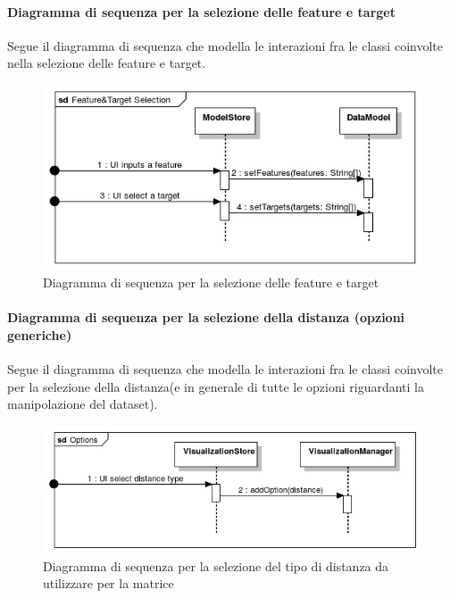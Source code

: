         \paragraph{Diagramma di sequenza per la selezione delle feature e target}
        Segue il diagramma di sequenza che modella le interazioni fra le classi coinvolte nella selezione delle feature e target.
        \begin{figure}[H]
                \centering\includegraphics[width=1\textwidth]{source/img/sequenza3.jpeg}
                \caption{Diagramma di sequenza per la selezione delle feature e target}
            \end{figure}
        
        \paragraph{Diagramma di sequenza per la selezione della distanza (opzioni generiche)}
        Segue il diagramma di sequenza che modella le interazioni fra le classi coinvolte per la selezione della distanza(e in generale di tutte le opzioni riguardanti la manipolazione del dataset).
        \begin{figure}[H]
                \centering\includegraphics[width=1\textwidth]{source/img/sequenza4.jpeg}
                \caption{Diagramma di sequenza per la selezione del tipo di distanza da utilizzare per la matrice}
        \end{figure}
        
